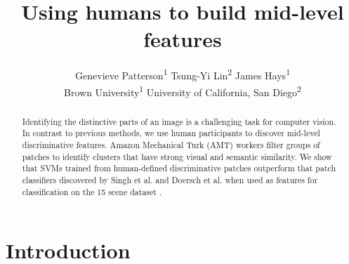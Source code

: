 \documentclass[10pt,twocolumn,letterpaper]{article}
\title{\vspace{-5ex}Using humans to build mid-level features\vspace{-3ex}}
\author{Genevieve Patterson\textsuperscript{1} \quad Tsung-Yi Lin\textsuperscript{2} \quad James Hays\textsuperscript{1}\\
 Brown University\textsuperscript{1} \quad University of California, San Diego\textsuperscript{2}}
\begin{document}
\maketitle
\begin{abstract}
  Identifying the distinctive parts of an image is a challenging task for computer vision. In contrast to previous methods, we use human participants to discover mid-level discriminative features. Amazon Mechanical Turk (AMT) workers filter groups of patches to identify clusters that have strong visual and semantic similarity.  We show that SVMs trained from human-defined discriminative patches outperform that patch classifiers discovered by Singh et al. and Doersch et al. \cite{singh2012unsupervised, doersch2012makes} when used as features for classification on the 15 scene dataset \cite{lazebnik2006beyond}.

\end{abstract}

\section{Introduction}
%
\end{document}
